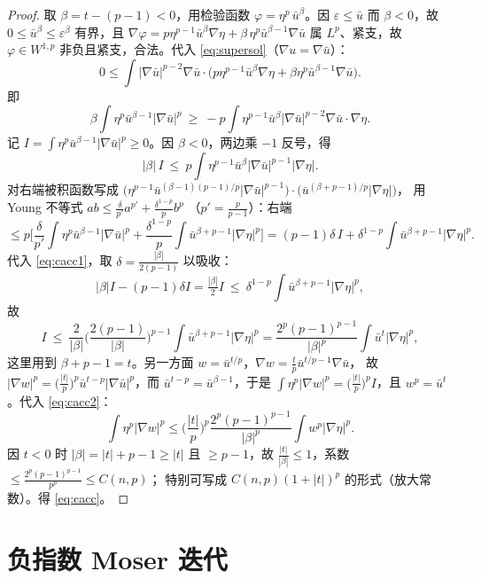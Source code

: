 \documentclass[11pt]{ctexart}
\newcommand{\ub}{\bar{u}}
\newcommand{\eps}{\varepsilon}
\theoremstyle{plain}
\theoremstyle{definition}
\begin{document}
\begin{proof}
取 $\beta=t-(p-1)<0$，用检验函数 $\varphi=\eta^p\,\ub^{\beta}$。因
$\eps\le\ub$ 而 $\beta<0$，故 $0\le\ub^\beta\le\eps^\beta$ 有界，且
$\nabla\varphi=p\eta^{p-1}\ub^{\beta}\nabla\eta+\beta\,\eta^p\ub^{\beta-1}\nabla\ub$
属 $L^p$、紧支，故 $\varphi\in W^{1,p}$ 非负且紧支，合法。代入
\eqref{eq:supersol}（$\nabla u=\nabla\ub$）：
\[
0\le\int|\nabla\ub|^{p-2}\nabla\ub\cdot\Big(p\eta^{p-1}\ub^{\beta}\nabla\eta
+\beta\eta^p\ub^{\beta-1}\nabla\ub\Big).
\]
即
\[
\beta\int\eta^p\ub^{\beta-1}|\nabla\ub|^p
\ \ge\ -p\int\eta^{p-1}\ub^{\beta}|\nabla\ub|^{p-2}\nabla\ub\cdot\nabla\eta .
\]
记 $I=\int\eta^p\ub^{\beta-1}|\nabla\ub|^p\ge0$。因 $\beta<0$，两边乘
$-1$ 反号，得
\begin{equation}\label{eq:cacc1}
|\beta|\,I\ \le\ p\int\eta^{p-1}\ub^{\beta}|\nabla\ub|^{p-1}|\nabla\eta| .
\end{equation}
对右端被积函数写成
$\big(\eta^{p-1}\ub^{(\beta-1)(p-1)/p}|\nabla\ub|^{p-1}\big)
\cdot\big(\ub^{(\beta+p-1)/p}|\nabla\eta|\big)$，
用 Young 不等式 $ab\le\frac{\delta}{p'}a^{p'}+\frac{\delta^{1-p}}{p}b^{p}$
（$p'=\frac{p}{p-1}$）：右端
\[
\le p\Big[\frac{\delta}{p'}\int\eta^p\ub^{\beta-1}|\nabla\ub|^p
+\frac{\delta^{1-p}}{p}\int\ub^{\beta+p-1}|\nabla\eta|^p\Big]
=(p-1)\delta\,I+\delta^{1-p}\!\int\ub^{\beta+p-1}|\nabla\eta|^p.
\]
代入 \eqref{eq:cacc1}，取 $\delta=\frac{|\beta|}{2(p-1)}$ 以吸收：
\[
|\beta|I-(p-1)\delta I=\tfrac{|\beta|}{2}I
\ \le\ \delta^{1-p}\int\ub^{\beta+p-1}|\nabla\eta|^p,
\]
故
\begin{equation}\label{eq:cacc2}
I\ \le\ \frac{2}{|\beta|}\Big(\frac{2(p-1)}{|\beta|}\Big)^{p-1}
\int\ub^{\beta+p-1}|\nabla\eta|^p
= \frac{2^p(p-1)^{p-1}}{|\beta|^{p}}\int\ub^{t}|\nabla\eta|^p,
\end{equation}
这里用到 $\beta+p-1=t$。另一方面 $w=\ub^{t/p}$，$\nabla w=\frac{t}{p}\ub^{t/p-1}\nabla\ub$，
故 $|\nabla w|^p=\big(\frac{|t|}{p}\big)^p\ub^{t-p}|\nabla\ub|^p$，而
$\ub^{t-p}=\ub^{\beta-1}$，于是 $\int\eta^p|\nabla w|^p
=\big(\frac{|t|}{p}\big)^pI$，且 $w^p=\ub^{t}$。代入 \eqref{eq:cacc2}：
\[
\int\eta^p|\nabla w|^p\le\Big(\frac{|t|}{p}\Big)^p
\frac{2^p(p-1)^{p-1}}{|\beta|^{p}}\int w^p|\nabla\eta|^p.
\]
因 $t<0$ 时 $|\beta|=|t|+p-1\ge|t|$ 且 $\ge p-1$，故
$\frac{|t|}{|\beta|}\le1$，系数 $\le\frac{2^p(p-1)^{p-1}}{p^p}\le C(n,p)$；
特别可写成 $C(n,p)(1+|t|)^p$ 的形式（放大常数）。得 \eqref{eq:cacc}。
\end{proof}

\section{负指数 Moser 迭代}
\end{document}
